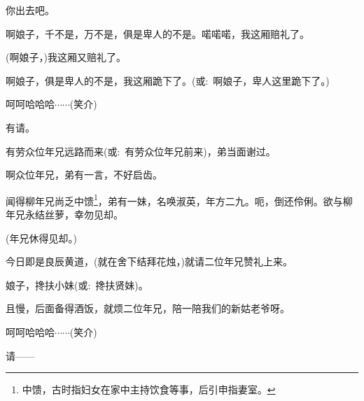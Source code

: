 {{你出去吧。}

{啊娘子，千不是，万不是，俱是卑人的不是。喏喏喏，我这厢赔礼了。}

{(啊娘子，)我这厢又赔礼了。}

{啊娘子，俱是卑人的不是，我这厢跪下了。({\akai 或}:~啊娘子，卑人这里跪下了。)}



{呵呵哈哈哈$\cdots{}\cdots{}$({\hwfs 笑介})}


{\vspace{5pt}}

{有请。}

{有劳众位年兄远路而来({\akai 或}:~有劳众位年兄前来)，弟当面谢过。}

{啊众位年兄，弟有一言，不好启齿。}

{闻得柳年兄尚乏中馈\footnote{中馈，古时指妇女在家中主持饮食等事，后引申指妻室。}，弟有一妹，名唤淑英，年方二九。呃，倒还伶俐。欲与柳年兄永结丝萝，幸勿见却。}

{(年兄休得见却。)}

{今日即是良辰黄道，(就在舍下结拜花烛，)就请二位年兄赞礼上来。}

{娘子，搀扶小妹({\akai 或}:~搀扶贤妹)。}

{且慢，后面备得酒饭，就烦二位年兄，陪一陪我们的新姑老爷呀。}

{呵呵哈哈哈$\cdots{}\cdots{}$({\hwfs 笑介})}

{请------}

}
